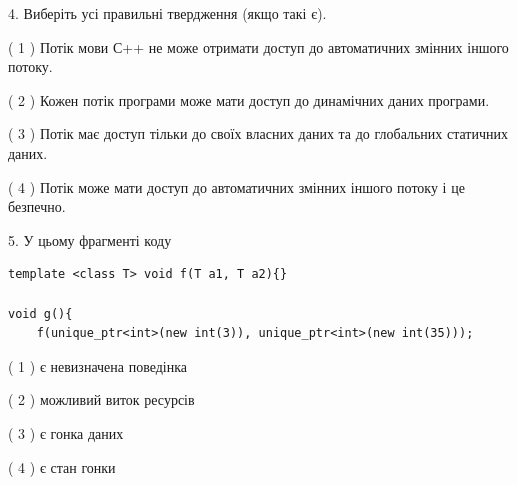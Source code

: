 \documentclass[12pt, ukrainian]{article}
\begin{document}
\begin {large}
{%
4. Виберіть усі правильні твердження (якщо такі є).\par
\vspace{2mm}

( 1 ) Потік мови С++ не може отримати доступ до автоматичних змінних іншого потоку.%

( 2 ) Кожен потік програми може мати доступ до динамічних даних програми.%

( 3 ) Потік має доступ тільки до своїх власних даних та до глобальних статичних даних.%

( 4 ) Потік може мати доступ до автоматичних змінних іншого потоку і це безпечно.%


5. У цьому фрагменті коду
\begin{verbatim}
template <class T> void f(T a1, T a2){}

void g(){
    f(unique_ptr<int>(new int(3)), unique_ptr<int>(new int(35)));
\end{verbatim}

( 1 ) є невизначена поведінка%

( 2 ) можливий виток ресурсів%

( 3 ) є гонка даних%

( 4 ) є стан гонки%
}
\end {large}
\end{document}
